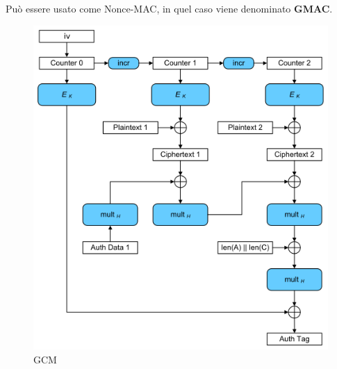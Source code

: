 \textsf{\small Può essere usato come Nonce-MAC, in quel caso viene denominato \textbf{GMAC}.}

\begin{figure}[H]
	\centering
	\includegraphics[width=.9\textwidth, height=.9\textheight, keepaspectratio]{./images/aes_modes/GCM-Galois_Counter_Mode_with_IV} 
	\caption{GCM}
	\label{fig:gcm}
\end{figure}

